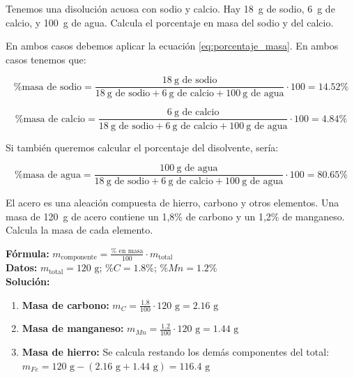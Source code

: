 \begin{example}
    Tenemos una disolución acuosa con sodio y calcio.
    Hay \qty{18}{\g} de sodio, \qty{6}{\g} de calcio, y \qty{100}{\g} de agua.
    Calcula el porcentaje en masa del sodio y del calcio.

    En ambos casos debemos aplicar la ecuación \eqref{eq:porcentaje_masa}.
    En ambos casos tenemos que:

    \begin{equation*}
        \text{\% masa de sodio} = \dfrac{\qty{18}{\g}\text{ de sodio}}{\qty{18}{\g}\text{ de sodio} + \qty{6}{\g}\text{ de calcio} + \qty{100}{\g}\text{ de agua}}\cdot 100 = 14.52 \%
    \end{equation*}

    \begin{equation*}
        \text{\% masa de calcio} = \dfrac{\qty{6}{\g}\text{ de calcio}}{\qty{18}{\g}\text{ de sodio} + \qty{6}{\g}\text{ de calcio} + \qty{100}{\g}\text{ de agua}}\cdot 100 = 4.84 \%
    \end{equation*}

    Si también queremos calcular el porcentaje del disolvente, sería:

    \begin{equation*}
        \text{\% masa de agua} = \dfrac{\qty{100}{\g}\text{ de agua}}{\qty{18}{\g}\text{ de sodio} + \qty{6}{\g}\text{ de calcio} + \qty{100}{\g}\text{ de agua}}\cdot 100 = 80.65 \%
    \end{equation*}
\end{example}

\begin{exercise}
    El acero es una aleación compuesta de hierro, carbono y otros elementos. Una masa de \qty{120}{\g} de acero contiene un 1,8\% de carbono y un 1,2\% de manganeso. Calcula la masa de cada elemento.
    \begin{solu}
        \textbf{Fórmula:} $m_{\text{componente}} = \frac{\% \text{ en masa}}{100} \cdot m_{\text{total}}$ \\
        \textbf{Datos:} $m_{\text{total}} = 120 \text{ g}$; $\%C = 1.8\%$; $\%Mn = 1.2\%$ \\
        \textbf{Solución:}
        \begin{enumerate}
            \item \textbf{Masa de carbono:} $m_{C} = \frac{1.8}{100} \cdot 120 \text{ g} = 2.16 \text{ g}$
            \item \textbf{Masa de manganeso:} $m_{Mn} = \frac{1.2}{100} \cdot 120 \text{ g} = 1.44 \text{ g}$
            \item \textbf{Masa de hierro:} Se calcula restando los demás componentes del total: \\
            $m_{Fe} = 120 \text{ g} - (2.16 \text{ g} + 1.44 \text{ g}) = 116.4 \text{ g}$
        \end{enumerate}
    \end{solu}
\end{exercise}

